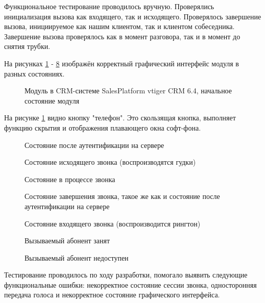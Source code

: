 Функциональное тестирование проводилось вручную. Проверялись инициализация вызова как входящего, так и исходящего. Проверялось завершение вызова, инициируемое как нашим клиентом, так и клиентом собеседника. Завершение вызова проверялось как в момент разговора, так и в момент до снятия трубки.

На рисунках \ref{image:test1} - \ref{image:test8} изображён корректный графический интерфейс модуля в разных состояниях.

\begin{figure}[h!]
\caption{Модуль в CRM-системе SalesPlatform vtiger CRM 6.4, начальное состояние модуля}
\label{image:test1}
\end{figure}

На рисунке \ref{image:test1} видно кнопку "телефон". Это скользящая кнопка, выполняет функцию скрытия и отображения плавающего окна софт-фона.

\begin{figure}[h]
\caption{Состояние после аутентификации на сервере}
\label{image:test2}
\end{figure}

\begin{figure}[h]
\caption{Состояние исходящего звонка (воспроизводятся гудки)}
\label{image:test3}
\end{figure}

\begin{figure}[h]
\caption{Состояние в процессе звонка}
\label{image:test4}
\end{figure}

\begin{figure}[h]
\caption{Состояние завершения звонка, такое же как и состояние после аутентификации на сервере}
\label{image:test5}
\end{figure}

\begin{figure}[h]
\caption{Состояние входящего звонка (воспроизводится рингтон)}
\label{image:test6}
\end{figure}

\begin{figure}[h]
\caption{Вызываемый абонент занят}
\label{image:test7}
\end{figure}

\begin{figure}[h]
\caption{Вызываемый абонент недоступен}
\label{image:test8}
\end{figure}

Тестирование проводилось по ходу разработки, помогало выявить следующие функциональные ошибки: некорректное состояние сессии звонка, односторонняя передача голоса и некорректное состояние графического интерфейса.

